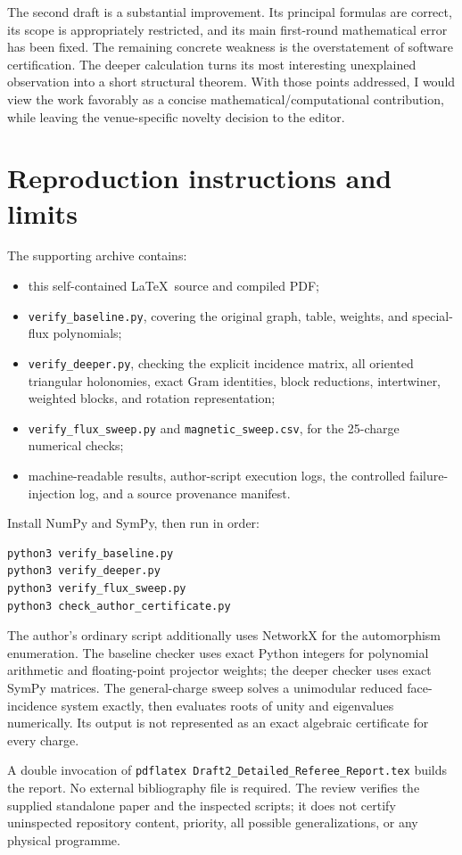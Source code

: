 \documentclass[11pt,a4paper]{article}
\begin{document}
The second draft is a substantial improvement. Its principal formulas are correct, its scope is appropriately restricted, and its main first-round mathematical error has been fixed. The remaining concrete weakness is the overstatement of software certification. The deeper calculation turns its most interesting unexplained observation into a short structural theorem. With those points addressed, I would view the work favorably as a concise mathematical/computational contribution, while leaving the venue-specific novelty decision to the editor.

\appendix
\small
\section{Reproduction instructions and limits}
The supporting archive contains:
\begin{itemize}
\item this self-contained \LaTeX\ source and compiled PDF;
\item \texttt{verify\_baseline.py}, covering the original graph, table, weights, and special-flux polynomials;
\item \texttt{verify\_deeper.py}, checking the explicit incidence matrix, all oriented triangular holonomies, exact Gram identities, block reductions, intertwiner, weighted blocks, and rotation representation;
\item \texttt{verify\_flux\_sweep.py} and \texttt{magnetic\_sweep.csv}, for the 25-charge numerical checks;
\item machine-readable results, author-script execution logs, the controlled failure-injection log, and a source provenance manifest.
\end{itemize}
Install NumPy and SymPy, then run in order:
\begin{verbatim}
python3 verify_baseline.py
python3 verify_deeper.py
python3 verify_flux_sweep.py
python3 check_author_certificate.py
\end{verbatim}
The author's ordinary script additionally uses NetworkX for the automorphism enumeration. The baseline checker uses exact Python integers for polynomial arithmetic and floating-point projector weights; the deeper checker uses exact SymPy matrices. The general-charge sweep solves a unimodular reduced face-incidence system exactly, then evaluates roots of unity and eigenvalues numerically. Its output is not represented as an exact algebraic certificate for every charge.

A double invocation of \texttt{pdflatex Draft2\_Detailed\_Referee\_Report.tex} builds the report. No external bibliography file is required. The review verifies the supplied standalone paper and the inspected scripts; it does not certify uninspected repository content, priority, all possible generalizations, or any physical programme.
\end{document}
